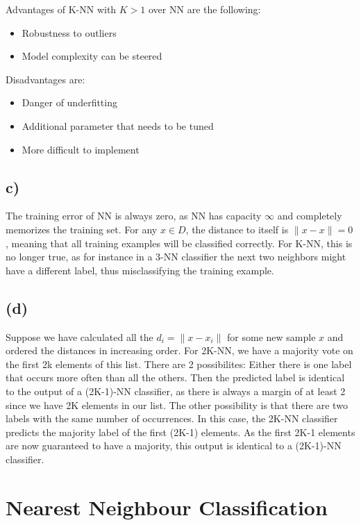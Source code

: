 \documentclass{scrartcl}
\begin{document}
Advantages of K-NN with $K > 1$ over NN are the following:
\begin{itemize}
  \item Robustness to outliers
  \item Model complexity can be steered
\end{itemize}

Disadvantages are:
\begin{itemize}
  \item Danger of underfitting
  \item Additional parameter that needs to be tuned
  \item More difficult to implement
\end{itemize}

\subsection{c)}
The training error of NN is always zero, as NN has capacity $\infty$ and completely memorizes the training set.
For any $x \in D$, the distance to itself is $\lVert x - x\rVert = 0$, meaning that all training examples will be
classified correctly.
For K-NN, this is no longer true, as for instance in a 3-NN classifier the next two neighbors might have a different label, thus misclassifying the training example.

\subsection{(d)}
Suppose we have calculated all the $d_i = \lVert x - x_i \rVert$ for some new sample $x$
and ordered the distances in increasing order.
For 2K-NN, we have a majority vote on the first 2k elements of this list.
There are 2 possibilites: Either there is one label that occurs more often than all the others.
Then the predicted label is identical to the output of a (2K-1)-NN classifier,
as there is always a margin of at least 2 since we have 2K elements in our list.
The other possibility is that there are two labels with the same number of occurrences.
In this case, the 2K-NN classifier predicts the majority label of the first (2K-1) elements.
As the first 2K-1 elements are now guaranteed to have a majority, this output is identical to a (2K-1)-NN
classifier. 

\section{Nearest Neighbour Classification}\label{prob2}
\end{document}
